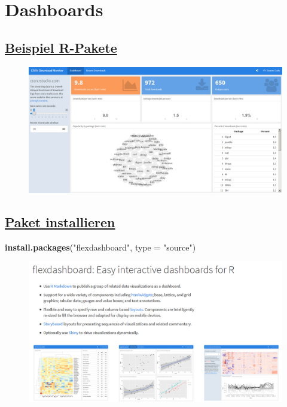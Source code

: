 \documentclass[]{article}
\newenvironment{Shaded}{\begin{snugshade}}{\end{snugshade}}
\newcommand{\KeywordTok}[1]{\textcolor[rgb]{0.13,0.29,0.53}{\textbf{#1}}}
\newcommand{\DataTypeTok}[1]{\textcolor[rgb]{0.13,0.29,0.53}{#1}}
\newcommand{\StringTok}[1]{\textcolor[rgb]{0.31,0.60,0.02}{#1}}
\newcommand{\NormalTok}[1]{#1}
\begin{document}
\section{Dashboards}\label{dashboards}

\subsection{\texorpdfstring{\href{https://gallery.shinyapps.io/cran-gauge/}{\textbf{Beispiel
R-Pakete}}}{Beispiel R-Pakete}}\label{beispiel-r-pakete}

\begin{figure}
\centering
\includegraphics{figure/CRANdownloads.PNG}
\caption{}
\end{figure}

\subsection{\texorpdfstring{\href{https://blog.rstudio.org/2016/05/17/flexdashboard-easy-interactive-dashboards-for-r/}{\textbf{Paket
installieren}}}{Paket installieren}}\label{paket-installieren}

\begin{Shaded}
\begin{Highlighting}[]
\KeywordTok{install.packages}\NormalTok{(}\StringTok{"flexdashboard"}\NormalTok{, }\DataTypeTok{type =} \StringTok{"source"}\NormalTok{)}
\end{Highlighting}
\end{Shaded}

\begin{figure}
\centering
\includegraphics{figure/flexdashboards.PNG}
\caption{}
\end{figure}
\end{document}
